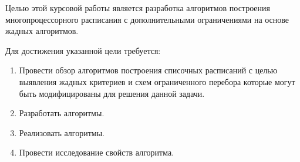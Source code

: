 Целью этой курсовой работы является разработка алгоритмов построения многопроцессорного расписания с дополнительными ограничениями на основе жадных алгоритмов.

Для достижения указанной цели требуется:
\begin{enumerate}
    \item Провести обзор алгоритмов построения списочных расписаний с целью выявления жадных критериев и схем ограниченного перебора которые могут быть модифицированы для решения данной задачи.
    \item Разработать алгоритмы.
    \item Реализовать алгоритмы.
    \item Провести исследование свойств алгоритма.
\end{enumerate}